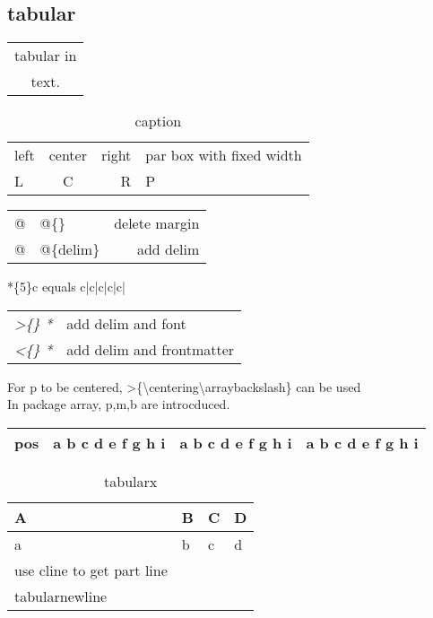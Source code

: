 \documentclass{article}
\begin{document}
\subsection{tabular}
    \begin{tabular}{|c|}
        tabular in \\
        text.
    \end{tabular}

    \begin{table}
    \centering
    \begin{tabular}{lcr|p{6em}}
      left & center &  right & par box with fixed width \\
      L    & C      &  R     & P
    \end{tabular}
    \caption{caption}
    \end{table}

    \begin{table}
    \raggedleft
    \begin{tabular}{@{} r@{:}lr @{}}
        @ & @\{\} & delete margin \\
        @ & @\{delim\} & add delim
    \end{tabular}
    \end{table}

    *\{5\}c equals c|c|c|c|c|

    \begin{table}
    \centering
    \begin{tabular}{|>{\itshape}r<{*} l}
        >\{\} & add delim and font \\
        <\{\} & add delim and frontmatter
    \end{tabular}
    \end{table}

    For p to be centered, >\{\textbackslash centering\textbackslash arraybackslash\} can be used\\
    In package array, p,m,b are introcduced.

    \begin{table}
    \centering
    \begin{tabular}{cp{2em}m{2em}b{2em}}
        \hline
        pos & a b c d e f g h i & a b c d e f g h i & a b c d e f g h i \\
        \hline
    \end{tabular}
    \end{table}

    \begin{table}
    \centering
    \caption{tabularx}
    \begin{tabularx}{14em}{|*{4}{>{\centering\arraybackslash}X|}}
        \hline
        A & B & C & D \\ \cline{2-3} 
        a & b & c & d \\ \cline{1-1}
        use cline to get part line \\ \cline{1-1} \cline{3-3}
        tabularnewline \tabularnewline
    \end{tabularx}
    \end{table}
\end{document}

